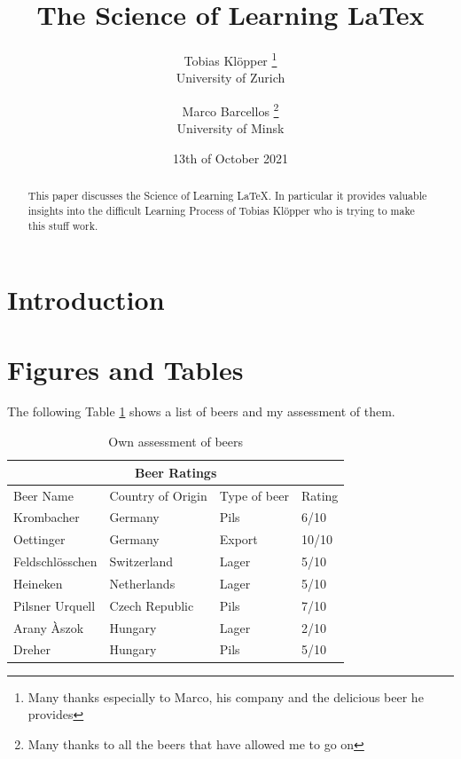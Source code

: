 \documentclass{article}
\begin{document}
\title{The Science of Learning LaTex}
\author{Tobias Klöpper \thanks{Many thanks especially to Marco, his company and the delicious beer he provides} \\
\normalsize University of Zurich
\and Marco Barcellos \thanks{Many thanks to all the beers that have allowed me to go on}\\
\normalsize University of Minsk}
\date{13th of October 2021}
\maketitle
\begin{abstract}
This paper discusses the Science of Learning LaTeX. In particular it provides valuable insights into the difficult Learning Process of Tobias Klöpper who is trying to make this stuff work.
\end{abstract}
\section{Introduction}
\Blindtext
\newpage
\section{Figures and Tables}
The following Table \ref{table:1} shows a list of beers and my assessment of them.
\begin{table}[h!]
\begin{tabular}{ |p{3cm}||p{3cm}|p{3cm}|p{3cm}|  }
 \hline
 \multicolumn{4}{|c|}{Beer Ratings} \\
 \hline
 Beer Name & Country of Origin &Type of beer&Rating\\
 \hline
 Krombacher   & Germany    & Pils &   6/10\\
 Oettinger&   Germany  & Export   &10/10\\
 Feldschlösschen &Switzerland & Lager &  5/10\\
 Heineken    &Netherlands & Lager &  5/10\\
 Pilsner Urquell&   Czech Republic  & Pils & 7/10\\
 Arany Àszok& Hungary  & Lager   & 2/10\\
 Dreher& Hungary  & Pils & 5/10\\
 \hline
 \end{tabular}
 \caption{Own assessment of beers}
 \label{table:1}
\end{table}
\end{document}
